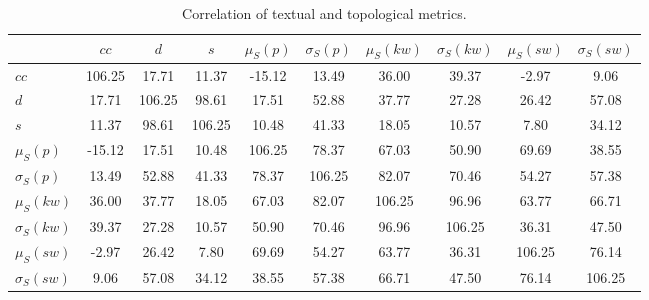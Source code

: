 \begin{table*}[h!]
\begin{center}
\begin{tabular}{| l || c | c | c | c | c | c | c | c | c |}\hline
 & $cc$ & $d$ & $s$ & $\mu_S(p)$ & $\sigma_S(p)$ & $\mu_S(kw)$ & $\sigma_S(kw)$ & $\mu_S(sw)$ & $\sigma_S(sw)$ \\\hline\hline
$cc$ & 106.25  & 17.71  & 11.37  & -15.12  & 13.49  & 36.00  & 39.37  & -2.97  & 9.06 \\\hline
$d$ & 17.71  & 106.25  & 98.61  & 17.51  & 52.88  & 37.77  & 27.28  & 26.42  & 57.08 \\
$s$ & 11.37  & 98.61  & 106.25  & 10.48  & 41.33  & 18.05  & 10.57  & 7.80  & 34.12 \\
$\mu_S(p)$ & -15.12  & 17.51  & 10.48  & 106.25  & 78.37  & 67.03  & 50.90  & 69.69  & 38.55 \\
$\sigma_S(p)$ & 13.49  & 52.88  & 41.33  & 78.37  & 106.25  & 82.07  & 70.46  & 54.27  & 57.38 \\
$\mu_S(kw)$ & 36.00  & 37.77  & 18.05  & 67.03  & 82.07  & 106.25  & 96.96  & 63.77  & 66.71 \\
$\sigma_S(kw)$ & 39.37  & 27.28  & 10.57  & 50.90  & 70.46  & 96.96  & 106.25  & 36.31  & 47.50 \\
$\mu_S(sw)$ & -2.97  & 26.42  & 7.80  & 69.69  & 54.27  & 63.77  & 36.31  & 106.25  & 76.14 \\
$\sigma_S(sw)$ & 9.06  & 57.08  & 34.12  & 38.55  & 57.38  & 66.71  & 47.50  & 76.14  & 106.25 \\
\end{tabular}
\caption{Correlation of textual and topological metrics.}
\end{center}
\end{table*}